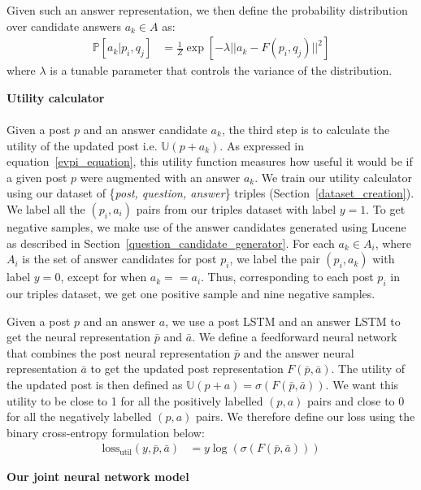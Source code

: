 \documentclass[11pt]{article}
\newcommand{\U}{\mathbb{U}}
\begin{document}
Given such an answer representation, we then define the probability distribution over candidate answers $a_k \in A$ as: 
\begin{align}
\mathbb{P}[a_k |p_i,q_j]  
&= \frac 1 Z \exp\left[- \lambda || a_k  -  F(p_i,q_j) ||^2\right]
\end{align}
where $\lambda$ is a tunable parameter that controls the variance of the distribution.

\textbf{Utility calculator}\label{utility_calculator}\\\\
Given a post $p$ and an answer candidate $a_k$, the third step is to calculate the utility of the updated post i.e. $\U(p + a_k)$. As expressed in equation~\ref{evpi_equation}, this utility function measures how useful it would be if a given post $p$ were augmented with an answer $a_k$. We train our utility calculator using our dataset of \{\textit{post, question, answer}\} triples (Section~\ref{dataset_creation}). We label all the $(p_i, a_i)$ pairs from our triples dataset with label $y=1$. To get negative samples, we make use of the answer candidates generated using Lucene as described in Section~\ref{question_candidate_generator}. For each $a_k \in A_i$, where $A_i$ is the set of answer candidates for post $p_i$, we label the pair $(p_i, a_k)$ with label $y=0$, except for when $a_k == a_i$. Thus, corresponding to each post $p_i$ in our triples dataset, we get one positive sample and nine negative samples. 

Given a post $p$ and an answer $a$, we use a post LSTM and an answer LSTM to get the neural representation $\bar{p}$ and $\bar{a}$. We define a feedforward neural network that combines the post neural representation $\bar{p}$ and the answer neural representation $\bar{a}$ to get the updated post representation $F(\bar{p}, \bar{a})$. The utility of the updated post is then defined as $\U(p+a) = \sigma ( F(\bar{p}, \bar{a}) )$. We want this utility to be close to 1 for all the positively labelled $(p,a)$ pairs and close to 0 for all the negatively labelled $(p, a)$ pairs. We therefore define our loss using the binary cross-entropy formulation below:
%
\begin{align}\label{eq_utility_calculator}
  \textrm{loss}_{\textrm{util}}(y, \bar p, \bar a) &= y \log(\sigma (F(\bar{p}, \bar{a})))
\end{align}

\textbf{Our joint neural network model}\label{neural_network}\\\\
\end{document}
